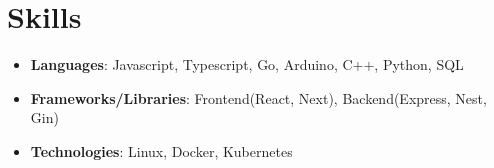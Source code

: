 \documentclass[letterpaper,11pt]{article}
\newcommand{\resumeItem}[2]{
  \item\small{
    \textbf{#1}{: #2 \vspace{-2pt}}
  }
}
\newcommand{\resumeSubItem}[2]{\resumeItem{#1}{#2}\vspace{-4pt}}
\newcommand{\resumeSubHeadingListStart}{\begin{itemize}[leftmargin=*]}
\newcommand{\resumeSubHeadingListEnd}{\end{itemize}}
\begin{document}
\section{Skills}
  \resumeSubHeadingListStart
  \resumeSubItem{Languages}{Javascript, Typescript, Go, Arduino, C++, Python, SQL}
  \resumeSubItem{Frameworks/Libraries}{Frontend(React, Next), Backend(Express, Nest, Gin)}
  \resumeSubItem{Technologies}{Linux, Docker, Kubernetes}
\resumeSubHeadingListEnd

\end{document}

